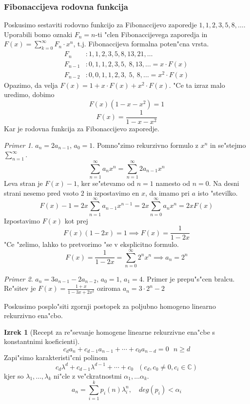\documentclass[a4paper,12pt]{article}
\theoremstyle{definition}
\newtheorem{theorem}[counter]{Izrek}
\theoremstyle{remark}
\newtheorem*{ex}{Primer}
\newcommand{\C}{\mathbb{C}}
\begin{document}
\subsubsection{Fibonaccijeva rodovna funkcija}
Poskusimo sestaviti rodovno funkcijo za Fibonaccijevo zaporedje $1, 1, 2, 3, 5, 8, \ldots$. Uporabili bomo oznaki $F_n = n$-ti "clen Fibonaccijevega zaporedja in $F(x) = \sum_{k = 0}^\infty F_n \cdot x^n$, t.j. Fibonaccijeva formalna poten"cna vrsta.
\begin{align*}
	F_n&: 1, 1, 2, 3, 5, 8, 13, 21, \ldots \\
	F_{n-1}&: 0, 1, 1, 2, 3, 5, \ 8, 13, \ldots = x \cdot F(x)\\
	F_{n-2}&: 0, 0, 1, 1, 2, 3, \ 5, \ 8, \ldots = x^2 \cdot F(x)
\end{align*}
Opazimo, da velja $F(x) = 1 + x\cdot F(x) + x^2 \cdot F(x)$. "Ce ta izraz malo uredimo, dobimo
\[F(x)(1 - x - x^2) = 1\]
\[F(x) = \frac{1}{1-x-x^2}\]
Kar je rodovna funkcija za Fibonaccijevo zaporedje.
\label{TODO: izpeljava eksplicitne formule}
\begin{ex}
	$a_n = 2a_{n-1}$, $a_0 = 1$. Pomno"zimo rekurzivno formulo z $x^n$ in se"stejmo $\sum_{n=1}^\infty$.
	\[\sum_{n=1}^\infty a_n x^n = \sum_{n=1}^\infty 2a_{n-1}x^n\]
	Leva stran je $F(x)-1$, ker se"stevamo od $n=1$ namesto od $n=0$. Na desni strani nesemo pred vsoto $2$ in izpostavimo en $x$, da imamo pri $a$ isto "stevilko.
	\[F(x)-1 = 2x\sum_{n=1}^\infty a_{n-1}x^{n-1}=2x\sum_{n=0}^\infty a_{n}x^{n} = 2xF(x)\]
	Izpostavimo $F(x)$ kot prej
	\[F(x)(1-2x)=1 \implies F(x)=\frac{1}{1-2x}\]
	"Ce "zelimo, lahko to pretvorimo "se v eksplicitno formulo.
	\[F(x) = \frac{1}{1-2x} = \sum_{n=0}^\infty 2^nx^n \implies a_n = 2^n\]
\end{ex}

\begin{ex}
	$a_n = 3a_{n-1}-2a_{n-2}$, $a_0 = 1$, $a_1 = 4$. Primer je prepu"s"cen bralcu. Re"sitev je $F(x) = \frac{1+x}{1-3x+2x^2}$ oziroma $a_n = 3\cdot2^n-2$
\end{ex}

Poskusimo posplo"siti zgornji postopek za poljubno homogeno linearno rekurzivno ena"cbo.
\begin{theorem}[Recept za re"sevanje homogene linearne rekurzivne ena"cbe s konstantnimi koeficienti]
    \[c_d a_n + c_{d - 1} a_{n - 1} + \cdots + c_0 a_{n - d} = 0 \ \ \ n \geqslant d\]
    Zapi"simo karakteristi"cni polinom
    \[c_d \lambda^d + c_{d - 1} \lambda^{d - 1} + \cdots + c_0 \ \ \ (c_d, c_0 \neq 0, c_i \in \C)\]
    kjer so $\lambda_1,\ldots, \lambda_k$ ni"cle z ve"ckratnostmi $\alpha_1, \ldots \alpha_k$.
    \[a_n = \sum_{i = 1}^k p_i (n) \lambda_i^n, \quad deg (p_i) < \alpha_i\]
    \label{TODO: kaj je ta izrek? mal sm probu preuredit, ampak sm ugotovu da ne razumm. Also nism pregledu dokaza}
\end{theorem}
\end{document}
